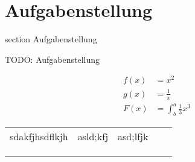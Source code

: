 \section*{Aufgabenstellung}
  {section}
  {Aufgabenstellung}

TODO: Aufgabenstellung


\begin{align*}
  f(x) &= x^2\\
  g(x) &= \frac{1}{x}\\
  F(x) &= \int^a_b \frac{1}{3}x^3
\end{align*}


\begin{table}[]
\begin{tabular}{lllll}
sdakfjhsdflkjh & asld;kfj & asd;lfjk &  &  \\
               &          &          &  &  \\
               &          &          &  &  \\
               &          &          &  & 
\end{tabular}
\end{table}